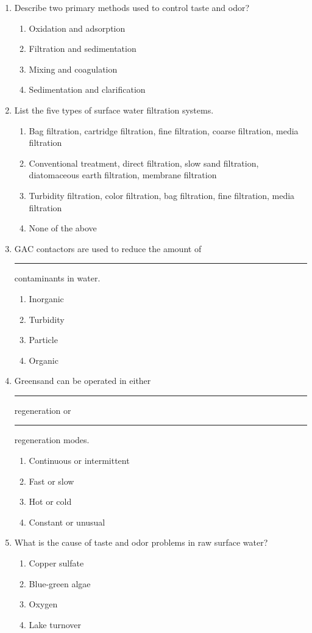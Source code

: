 \begin{enumerate}
\item Describe two primary methods used to control taste and odor?
\begin{enumerate}
\item Oxidation and adsorption
\item Filtration and sedimentation
\item Mixing and coagulation
\item Sedimentation and clarification
\end{enumerate}



\item List the five types of surface water filtration systems.
\begin{enumerate}
\item Bag filtration, cartridge filtration, fine filtration, coarse filtration, media filtration
\item Conventional treatment, direct filtration, slow sand filtration, diatomaceous
earth filtration, membrane filtration
\item Turbidity filtration, color filtration, bag filtration, fine filtration, media filtration
\item None of the above
\end{enumerate}

\item GAC contactors are used to reduce the amount of \rule{1cm}{0.5pt}  contaminants in water.
\begin{enumerate}
\item Inorganic
\item Turbidity
\item Particle
\item Organic
\end{enumerate}

\item Greensand can be operated in either \rule{1cm}{0.5pt}  regeneration or \rule{1cm}{0.5pt} regeneration modes.
\begin{enumerate}
\item Continuous or intermittent
\item Fast or slow
\item Hot or cold
\item Constant or unusual
\end{enumerate}

\item  What is the cause of taste and odor problems in raw surface water?\\
\begin{enumerate}
\item Copper sulfate\\
\item Blue-green algae\\
\item Oxygen\\
\item Lake turnover
\end{enumerate}


\end{enumerate}
